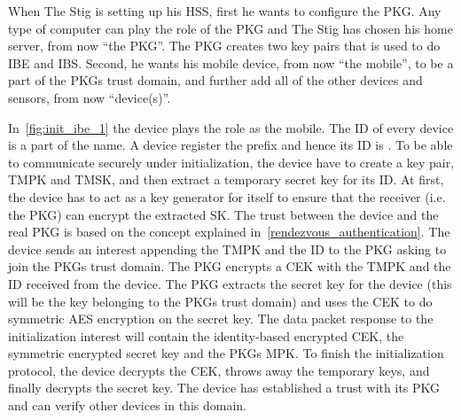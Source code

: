 When The Stig is setting up his \gls{HSS}, first he wants to configure the \gls{PKG}. 
Any type of computer can play the role of the \gls{PKG} and The Stig has chosen his home server, from now ``the PKG''.
The \gls{PKG} creates two key pairs that is used to do \gls{IBE} and \gls{IBS}.
Second, he wants his mobile device, from now ``the mobile'', to be a part of the \gls{PKG}s trust domain, and further add all of the other devices and sensors, from now ``device(s)''.

In~\autoref{fig:init_ibe_1} the device plays the role as the mobile. 
The \gls{ID} of every device is a part of the \gls{name}.
A device register the prefix  and hence its \gls{ID} is .
To be able to communicate securely under initialization, the device have to create a key pair, \gls{TMPK} and \gls{TMSK}, and then extract a temporary secret key for its \gls{ID}. 
At first, the device has to act as a key generator for itself to ensure that the \gls{receiver} (i.e. the \gls{PKG}) can encrypt the extracted \gls{SK}.
The trust between the device and the real \gls{PKG} is based on the concept explained in~\autoref{rendezvous_authentication}.
The device sends an \gls{interest} appending the \gls{TMPK} and the \gls{ID} to the \gls{PKG} asking to join the \gls{PKG}s trust domain.
The \gls{PKG} encrypts a \gls{CEK} with the \gls{TMPK} and the \gls{ID} received from the device. 
The \gls{PKG} extracts the secret key for the device (this will be the key belonging to the \gls{PKG}s trust domain) and uses the \gls{CEK} to do symmetric \gls{AES} encryption on the secret key. 
The \gls{data} packet response to the initialization \gls{interest} will contain the identity-based encrypted \gls{CEK}, the symmetric encrypted secret key and the \gls{PKG}s \gls{MPK}.
To finish the initialization protocol, the device decrypts the \gls{CEK}, throws away the temporary keys, and finally decrypts the secret key.
The device has established a trust with its \gls{PKG} and can verify other devices in this domain. 

